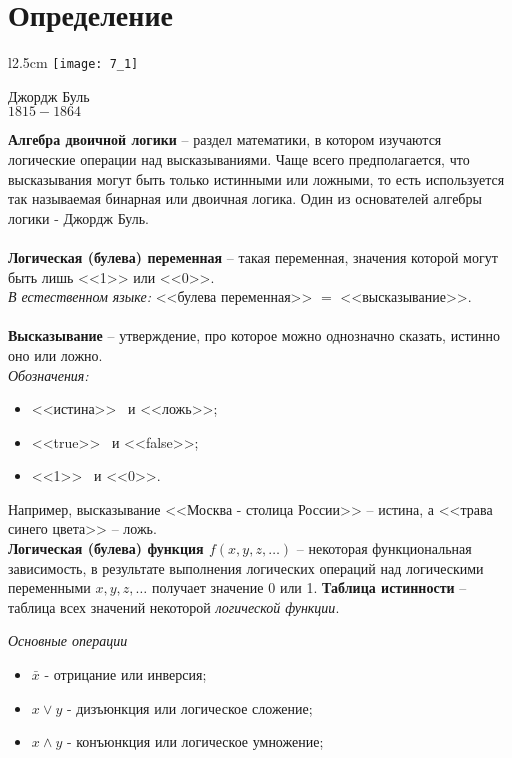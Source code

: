 \section{Определение}
\begin{wrapfigure}[13]{l}{2.5cm}
\texttt{[image: 7\_1]}
\begin{center}
\caption{}
\footnotesize{Джордж Буль}
\\\footnotesize{$1815 - 1864$}
\end{center}
\end{wrapfigure}
\textbf{Алгебра двоичной логики} -- раздел математики, в котором изучаются логические операции над высказываниями. Чаще всего предполагается, что высказывания могут быть только истинными или ложными, то есть используется так называемая бинарная или двоичная логика. Один из основателей алгебры логики - Джордж Буль.
\\
\\\textbf{Логическая (булева) переменная} – такая переменная, значения которой могут быть лишь <<1>> или <<0>>.
\\\emph{В естественном языке:} <<булева переменная>> $=$ <<высказывание>>.
\\
\textbf{\\Высказывание} -- утверждение, про которое можно однозначно сказать, истинно оно или ложно.
\\\emph{Обозначения:}
\begin{itemize}
  \item <<истина>> \ и <<ложь>>;
  \item <<true>> \ и <<false>>;
  \item <<1>> \ и <<0>>.
\end{itemize}
Например, высказывание <<Москва - столица России>> -- истина, а <<трава синего цвета>> -- ложь.
\\
\textbf{Логическая (булева) функция $f(x, y, z, …)$} -- некоторая функциональная зависимость, в результате выполнения логических операций над логическими переменными $x, y, z,\dots$ получает значение 0 или 1.
\textbf{Таблица истинности} -- таблица всех значений некоторой \emph{логической функции}.
\begin{center}
  \emph{Основные операции}
\end{center}
\begin{itemize}
\item $\bar{x}$ - отрицание или инверсия;
\item$x \vee y$ - дизъюнкция или логическое сложение;
\item$x \wedge y$ - конъюнкция или логическое умножение;\\
\end{itemize}

